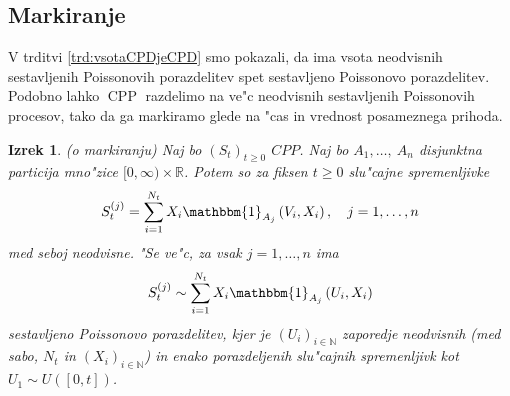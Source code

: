 \documentclass[12pt, a4paper, reqno]{amsart}
\theoremstyle{definition}
\theoremstyle{plain}
\newtheorem{izrek}[definicija]{Izrek}
\newcommand{\R}{\mathbb{R}}
\newcommand{\N}{\mathbb{N}}
\newcommand{\1}{\mathds{1}}
\DeclareMathOperator{\CPP}{CPP}
\begin{document}
%
%
%
%            

    \subsection{Markiranje}
        V trditvi \ref{trd:vsotaCPDjeCPD} smo pokazali, da ima vsota neodvisnih sestavljenih Poissonovih porazdelitev 
        spet sestavljeno Poissonovo porazdelitev. Podobno lahko $\CPP$ razdelimo na ve"c neodvisnih
        sestavljenih Poissonovih procesov, tako da ga markiramo glede na "cas in vrednost posameznega 
        prihoda. 
 
        \begin{izrek}(o markiranju)
            Naj bo $(S_t)_{t\geq0}$ $CPP$. Naj bo $A_1, \dots, \ A_n$ disjunktna particija mno"zice 
            $[0, \infty) \times \R$. Potem so za fiksen $t\geq0$ slu"cajne spremenljivke
            \begin{equation}
                S_t^{(j)} = \sum_{i=1}^{N_t}X_i\mathbbm{1}_{A_j}\left(V_i, X_i\right), \quad j = 1, \dots, n
                \label{eq:markedCPP}
            \end{equation}
            med seboj neodvisne. "Se ve"c, za vsak $j = 1, \dots, n$ ima
            \begin{equation*}
                S_t^{(j)} \sim \sum_{i=1}^{N_t}X_i\mathbbm{1}_{A_j}\left(U_i, X_i\right)
            \end{equation*}
            sestavljeno Poissonovo porazdelitev, kjer je $(U_i)_{i\in\N}$ zaporedje neodvisnih (med sabo, $N_t$ in $(X_i)_{i\in\N}$) in enako porazdeljenih slu"cajnih spremenljivk
            kot $U_1\sim U\left([0, t]\right)$.
            \label{izr:MarkiranjeCPP}
        \end{izrek}
\end{document}
